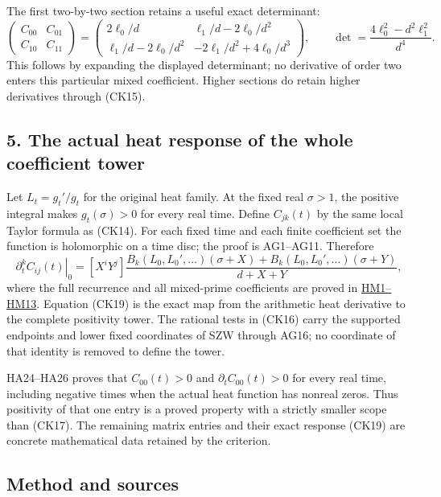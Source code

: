 \documentclass[
  10pt,
  a4paper,
]{article}
\begin{document}
The first two-by-two section retains a useful exact determinant: \[
\begin{pmatrix}C_{00}&C_{01}\\C_{10}&C_{11}\end{pmatrix}
=\begin{pmatrix}
2\ell_0/d&\ell_1/d-2\ell_0/d^2\\
\ell_1/d-2\ell_0/d^2&-2\ell_1/d^2+4\ell_0/d^3
\end{pmatrix},\qquad
\det=\frac{4\ell_0^2-d^2\ell_1^2}{d^4}.
\tag{CK18}
\] This follows by expanding the displayed determinant; no derivative of
order two enters this particular mixed coefficient. Higher sections do
retain higher derivatives through (CK15).

\subsection{5. The actual heat response of the whole coefficient
tower}\label{the-actual-heat-response-of-the-whole-coefficient-tower}

Let \(L_t=g_t'/g_t\) for the original heat family. At the fixed real
\(\sigma>1\), the positive integral makes \(g_t(\sigma)>0\) for every
real time. Define \(C_{jk}(t)\) by the same local Taylor formula as
(CK14). For each fixed time and each finite coefficient set the function
is holomorphic on a time disc; the proof is AG1--AG11. Therefore \[
\left.\partial_t^k C_{ij}(t)\right|_0
=[X^iY^j]\frac{B_k(L_0,L_0',\ldots)(\sigma+X)
+B_k(L_0,L_0',\ldots)(\sigma+Y)}{d+X+Y},
\tag{CK19}
\] where the full recurrence and all mixed-prime coefficients are proved
in \href{HEAT_MIXED_PRIME_RECURRENCE.md}{HM1--HM13}. Equation (CK19) is
the exact map from the arithmetic heat derivative to the complete
positivity tower. The rational tests in (CK16) carry the supported
endpoints and lower fixed coordinates of SZW through AG16; no coordinate
of that identity is removed to define the tower.

HA24--HA26 proves that \(C_{00}(t)>0\) and \(\partial_tC_{00}(t)>0\) for
every real time, including negative times when the actual heat function
has nonreal zeros. Thus positivity of that one entry is a proved
property with a strictly smaller scope than (CK17). The remaining matrix
entries and their exact response (CK19) are concrete mathematical data
retained by the criterion.

\subsection{Method and sources}\label{method-and-sources}
\end{document}
